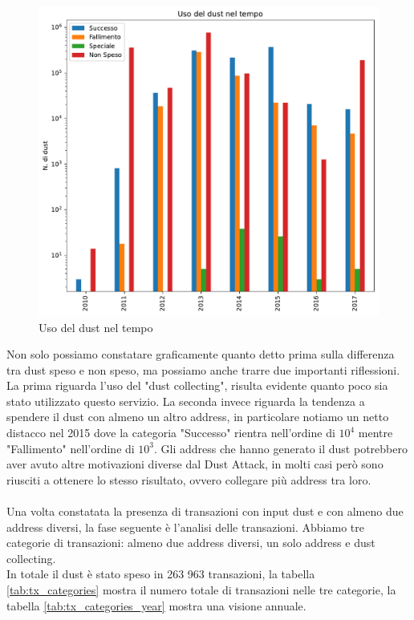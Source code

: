 \begin{figure}[h!]
    \centering
    \includegraphics[scale=0.7]{Grafici/uso_del_dust_new.pdf}
    \caption{Uso del dust nel tempo}
    \label{fig:dust_year}
\end{figure}
\FloatBarrier
Non solo possiamo constatare graficamente quanto detto prima sulla differenza tra dust speso e non speso, ma possiamo anche trarre due importanti riflessioni. La prima riguarda l'uso del "dust collecting", risulta evidente quanto poco sia stato utilizzato questo servizio. La seconda invece riguarda la tendenza a spendere il dust con almeno un altro address, in particolare notiamo un netto distacco nel 2015 dove la categoria "Successo" rientra nell'ordine di $10^4$ mentre "Fallimento" nell'ordine di $10^3$. Gli address che hanno generato il dust potrebbero aver avuto altre motivazioni diverse dal Dust Attack, in molti casi però sono riusciti a ottenere lo stesso risultato, ovvero collegare più address tra loro.\\\\
Una volta constatata la presenza di transazioni con input dust e con almeno due address diversi, la fase seguente è l'analisi delle transazioni. Abbiamo tre categorie di transazioni: almeno due address diversi, un solo address e dust collecting.\\
In totale il dust è stato speso in 263 963 transazioni, la tabella \ref{tab:tx_categories} mostra il numero totale di transazioni nelle tre categorie, la tabella \ref{tab:tx_categories_year} mostra una visione annuale.
